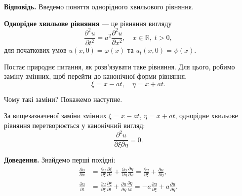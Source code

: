 \documentclass{exam_template}
\begin{document}
\textbf{Відповідь.} Введемо поняття однорідного хвильового рівняння.
\begin{definition}
    \textbf{Однорідне хвильове рівняння} --- це рівняння вигляду
    \begin{equation*}
        \frac{\partial^2 u}{\partial t^2} = a^2 \frac{\partial^2 u}{\partial x^2}, \quad x \in \mathbb{R}, \; t > 0,
    \end{equation*}
    для початкових умов $u(x,0)=\varphi(x)$ та $u_t(x,0) = \psi(x)$.
\end{definition}

Постає природнє питання, як розв'язувати таке рівняння. Для цього, 
робимо заміну змінних, щоб перейти до канонічної форми рівняння.
\begin{equation*}
    \xi = x - at, \quad \eta = x + at.
\end{equation*}

Чому такі заміни? Покажемо наступне.

\begin{proposition}
    За вищезазначеної заміни змінних $\xi = x - at$, $\eta = x + at$, однорідне
    хвильове рівняння перетворюється у канонічний вигляд:
    \begin{equation*}
        \frac{\partial^2 u}{\partial \xi\partial \eta} = 0.
    \end{equation*}
\end{proposition}

\textbf{Доведення.} Знайдемо перші похідні:
\begin{align*}
    \frac{\partial u}{\partial x} &= \frac{\partial u}{\partial \xi}\frac{\partial \xi}{\partial x} +
    \frac{\partial u}{\partial \eta}\frac{\partial \eta}{\partial x} = \frac{\partial u}{\partial \xi} + 
    \frac{\partial u}{\partial \eta}, \\
    \frac{\partial u}{\partial t} &= \frac{\partial u}{\partial \xi}\frac{\partial \xi}{\partial t} +
    \frac{\partial u}{\partial \eta}\frac{\partial \eta}{\partial t} = -a\frac{\partial u}{\partial \xi} +
    a\frac{\partial u}{\partial \eta}.
\end{align*}
\end{document}
